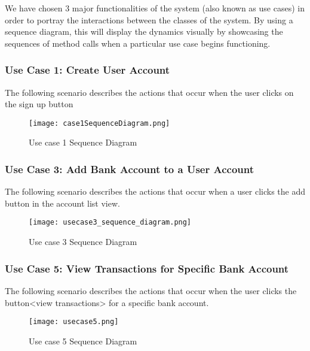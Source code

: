 \documentclass[12pt]{article}
\begin{document}
We have chosen 3 major functionalities of the system (also known as use cases) in order to portray the interactions between the classes of the system. By using a sequence diagram, this will display the dynamics visually by showcasing the sequences of method calls when a particular use case begins functioning.

\clearpage

\subsubsection{Use Case 1: Create User Account}

The following scenario describes the actions that occur when the user clicks on the sign up button

\begin{figure}[H]
\texttt{[image: case1SequenceDiagram.png]}
\caption{Use case 1 Sequence Diagram}
\label{fig:use-case-1-sequence-diagram}
\end{figure}

\clearpage

\subsubsection{Use Case 3: Add Bank Account to a User Account}

The following scenario describes the actions that occur when a user clicks the add button in the account list view.

\begin{figure}[H]
\texttt{[image: usecase3\_sequence\_diagram.png]}
\caption{Use case 3 Sequence Diagram}
\label{fig:use-case-3-sequence-diagram}
\end{figure}

\clearpage

\subsubsection{Use Case 5: View Transactions for Specific Bank Account}

The following scenario describes the actions that occur when the user clicks the button<view transactions> for a specific bank account.

\begin{figure}[H]
\texttt{[image: usecase5.png]}
\caption{Use case 5 Sequence Diagram}
\label{fig:use-case-5-sequence-diagram}
\end{figure}
\end{document}

